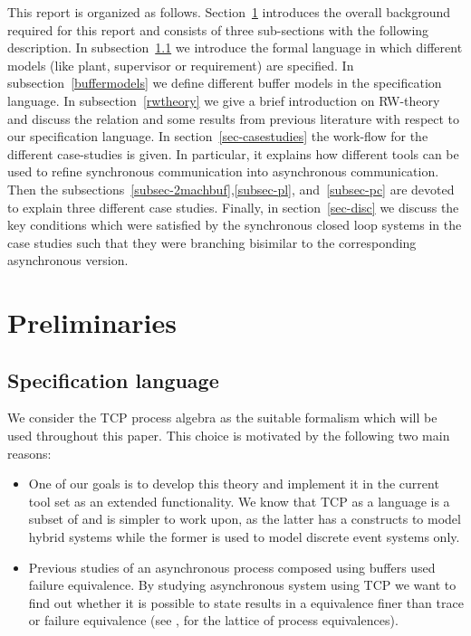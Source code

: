 \documentclass[a4paper,english,final]{article}
\theoremstyle{plain}
\theoremstyle{definition}
\begin{document}
This report is organized as follows. Section~\ref{prelim} introduces the overall background required for this report and consists of three sub-sections with the following description. In subsection~\ref{spec-lang} we introduce the formal language in which different models (like plant, supervisor or requirement) are specified. In subsection~\ref{buffermodels} we define different buffer models in the specification language. In subsection~\ref{rwtheory} we give a brief introduction on RW-theory and discuss the relation and some results from previous literature with respect to our specification language. In section~\ref{sec-casestudies} the work-flow for the different case-studies is given. In particular, it explains how different tools can be used to refine synchronous communication into asynchronous communication. Then the subsections~\ref{subsec-2machbuf},\ref{subsec-pl}, and~\ref{subsec-pc} are devoted to explain three different case studies. Finally, in section~\ref{sec-disc} we discuss the key conditions which were satisfied by the synchronous closed loop systems in the case studies such that they were branching bisimilar to the corresponding asynchronous version.

\section{Preliminaries}\label{prelim}
\subsection{Specification language}\label{spec-lang}
We consider the TCP process algebra \citep{acpbook} as the suitable formalism which will be used throughout this paper. This choice is motivated by the following two main reasons:
\begin{itemize}
\item One of our goals is to develop this theory and implement it in the current  \cite{chi} tool set as an extended functionality. We know that TCP as a language is a subset of  and is simpler to work upon, as the latter has a constructs to model hybrid systems while the former is used to model discrete event systems only.
\item Previous studies \cite{HHJ90,Fischer96,Pursuit} of an asynchronous process composed using buffers used failure equivalence. By studying asynchronous system using TCP we want to find out whether it is possible to state results in a equivalence finer than trace or failure equivalence (see \citep{Glabeek90}, for the lattice of process equivalences).
\end{itemize}
\end{document}
